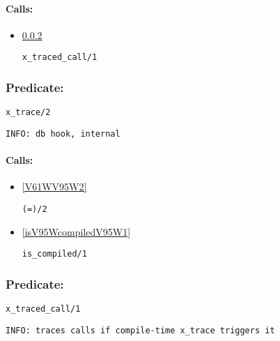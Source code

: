 \paragraph{Calls:} 
\begin{itemize}
\item \ref{xV95WtracedV95WcallV95W1} 
\begin{verbatim}
x_traced_call/1
\end{verbatim}

\end{itemize}

\subsubsection{Predicate:} \label{xV95WtraceV95W2}

\begin{verbatim}
x_trace/2
\end{verbatim}

{\small \begin{verbatim}
INFO: db hook, internal

\end{verbatim}}
\paragraph{Calls:} 
\begin{itemize}
\item \ref{V61WV95W2} 
\begin{verbatim}
(=)/2
\end{verbatim}

\item \ref{isV95WcompiledV95W1} 
\begin{verbatim}
is_compiled/1
\end{verbatim}

\end{itemize}

\subsubsection{Predicate:} \label{xV95WtracedV95WcallV95W1}

\begin{verbatim}
x_traced_call/1
\end{verbatim}

{\small \begin{verbatim}
INFO: traces calls if compile-time x_trace triggers it

\end{verbatim}}
